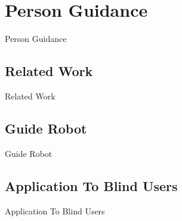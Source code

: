 \chapter{Person Guidance}
\label{chapter:person_guidance}

Person Guidance

\section{Related Work}

Related Work

\section{Guide Robot}

Guide Robot

\section{Application To Blind Users}

Application To Blind Users